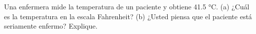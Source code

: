 \item Una enfermera mide la temperatura de un paciente y obtiene 41.5 °C. (a) ¿Cuál es la temperatura en la escala Fahrenheit? (b) ¿Usted piensa que el paciente está seriamente enfermo? Explique.
